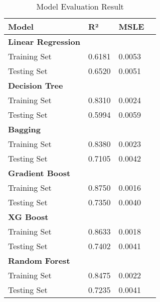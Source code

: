 \documentclass[conference]{IEEEtran}
\begin{document}
    \begin{table}[h]
        \centering
        \renewcommand{\arraystretch}{1.1}
        \begin{tabular}{
            | p{}
            | p{}
            | p{} |
            | p{}
            }
            \hline
            \textbf{Model} & \textbf{R²} & \textbf{MSLE} \\
            \hline
            \multicolumn{1}{|l}{\textbf{Linear Regression}} \\
            \hline
            Training Set   & 0.6181 & 0.0053 \\
            \hline
            Testing Set & 0.6520 & 0.0051 \\
            \hline
            \multicolumn{1}{|l}{\textbf{Decision Tree}}\\
            \hline
            Training Set & 0.8310 & 0.0024 \\
            \hline
            Testing Set & 0.5994 & 0.0059 \\
            \hline
            \multicolumn{1}{|l}{\textbf{Bagging}} \\
            \hline
            Training Set & 0.8380 & 0.0023 \\
            \hline
            Testing Set & 0.7105 & 0.0042 \\
            \hline
            \multicolumn{1}{|l}{\textbf{Gradient Boost}}\\
            \hline
            Training Set & 0.8750 & 0.0016 \\
            \hline
            Testing Set & 0.7350 & 0.0040 \\
            \hline
            \multicolumn{1}{|l}{\textbf{XG Boost}}\\
            \hline
            Training Set & 0.8633 & 0.0018 \\
            \hline
            Testing Set & 0.7402 & 0.0041 \\
            \hline
            \multicolumn{1}{|l}{\textbf{Random Forest}}\\
            \hline
            Training Set & 0.8475 & 0.0022 \\
            \hline
            Testing Set & 0.7235 & 0.0041 \\
            \hline
        \end{tabular}
    \caption{Model Evaluation Result}
    \end{table}
\end{document}
